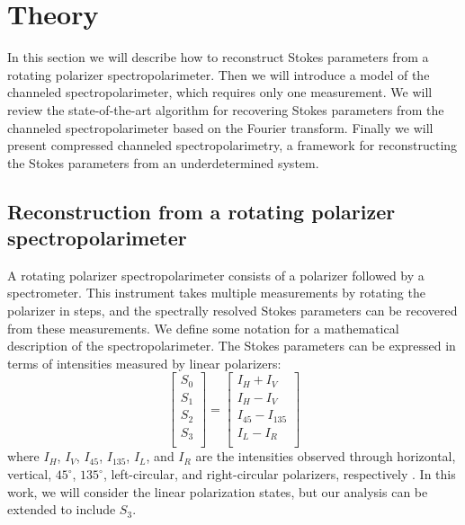 \documentclass[10pt]{article}
\numberwithin{equation}{subsection}
\begin{document}
\section{Theory}\label{SectionTheory}

In this section we will describe how to reconstruct Stokes parameters from a rotating polarizer spectropolarimeter.
Then we will introduce a model of the channeled spectropolarimeter, which requires only one measurement.
We will review the state-of-the-art algorithm for recovering Stokes parameters from the channeled spectropolarimeter based on the Fourier transform.
Finally we will present compressed channeled spectropolarimetry, a framework for reconstructing the Stokes parameters from an underdetermined system.

\subsection{Reconstruction from a rotating polarizer spectropolarimeter} \label{SectionRotatingPolarizer}
A rotating polarizer spectropolarimeter consists of a polarizer followed by a spectrometer.
This instrument takes multiple measurements by rotating the polarizer in steps, and the spectrally resolved Stokes parameters can be recovered from these measurements.
We define some notation for a mathematical description of the spectropolarimeter.
The Stokes parameters can be expressed in terms of intensities measured by linear polarizers:
    \begin{equation}
        \left[ \begin{array}{c}
            S_0 \\
            S_1 \\
            S_2 \\
            S_3 \\
        \end{array} \right]
         = \left[ \begin{array}{c}
            I_H + I_V \\
            I_H - I_V \\
             I_{45} - I_{135} \\
            I_L - I_R \\
        \end{array} \right]
    \end{equation}
    where $I_H$, $I_V$, $I_{45}$, $I_{135}$, $I_L$, and $I_R$ are the intensities observed through horizontal, vertical, $45^\circ$, $135^\circ$, left-circular, and right-circular polarizers, respectively \cite{Chipman95}.
    In this work, we will consider the linear polarization states, but our analysis can be extended to include $S_3$.
\end{document}
